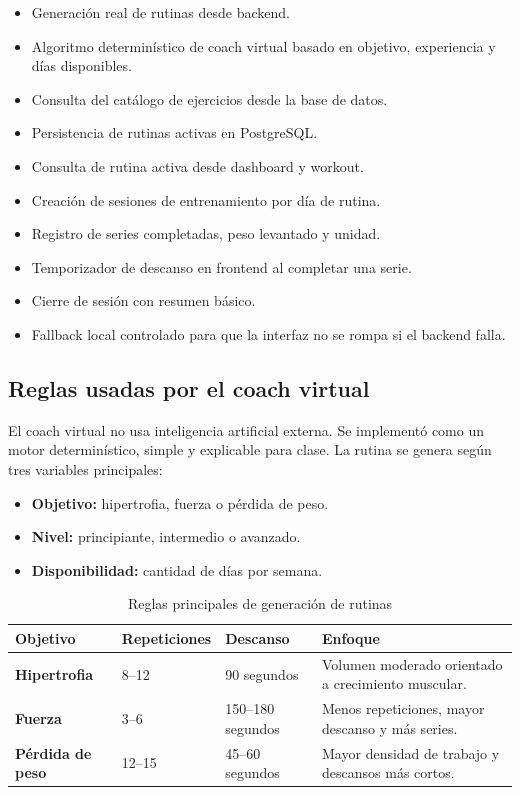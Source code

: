 \documentclass[12pt,a4paper]{article}
\begin{document}
\begin{itemize}
    \item Generación real de rutinas desde backend.
    \item Algoritmo determinístico de coach virtual basado en objetivo, experiencia y días disponibles.
    \item Consulta del catálogo de ejercicios desde la base de datos.
    \item Persistencia de rutinas activas en PostgreSQL.
    \item Consulta de rutina activa desde dashboard y workout.
    \item Creación de sesiones de entrenamiento por día de rutina.
    \item Registro de series completadas, peso levantado y unidad.
    \item Temporizador de descanso en frontend al completar una serie.
    \item Cierre de sesión con resumen básico.
    \item Fallback local controlado para que la interfaz no se rompa si el backend falla.
\end{itemize}

\subsection{Reglas usadas por el coach virtual}

El coach virtual no usa inteligencia artificial externa. Se implementó como un motor determinístico, simple y explicable para clase. La rutina se genera según tres variables principales:

\begin{itemize}
    \item \textbf{Objetivo:} hipertrofia, fuerza o pérdida de peso.
    \item \textbf{Nivel:} principiante, intermedio o avanzado.
    \item \textbf{Disponibilidad:} cantidad de días por semana.
\end{itemize}

\begin{table}[H]
\centering
\caption{Reglas principales de generación de rutinas}
\renewcommand{\arraystretch}{1.3}
\begin{tabularx}{\textwidth}{>{\bfseries}p{3cm} p{3cm} p{3cm} X}
\toprule
Objetivo & Repeticiones & Descanso & Enfoque \\
\midrule
Hipertrofia & 8--12 & 90 segundos & Volumen moderado orientado a crecimiento muscular. \\
Fuerza & 3--6 & 150--180 segundos & Menos repeticiones, mayor descanso y más series. \\
Pérdida de peso & 12--15 & 45--60 segundos & Mayor densidad de trabajo y descansos más cortos. \\
\bottomrule
\end{tabularx}
\end{table}
\end{document}
